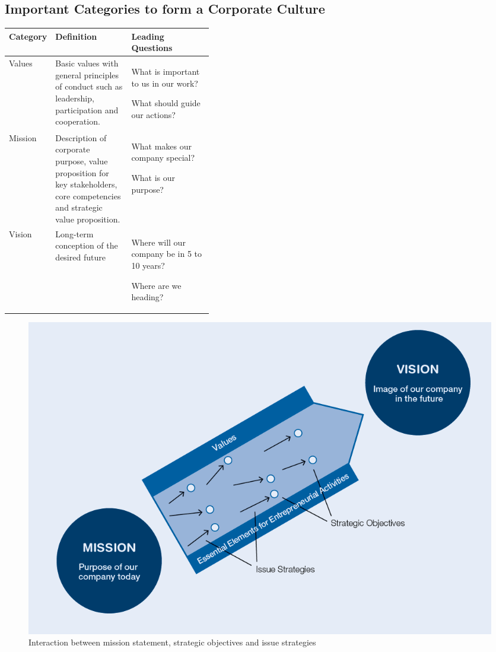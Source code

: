\documentclass[11pt]{article}
\theoremstyle{definition}
\begin{document}
\subsection{Important Categories to form a Corporate Culture}
\begin{tabularx}{\linewidth}{l X p{0.4\linewidth}}
	\textbf{Category} & \textbf{Definition} & \textbf{Leading Questions}\\
	\hline
	Values & Basic values with general principles of conduct such as leadership, participation and cooperation. & \begin{itemize}
		[
			left=0pt,
			nosep,
			before={\begin{minipage}[t]{\hsize}},
			after={\end{minipage}}
		]
		\item What is important to us in our work?
		\item What should guide our actions?
	\end{itemize}\\
	Mission & Description of corporate purpose, value proposition for key stakeholders, core competencies and strategic value proposition. & \begin{itemize}
		[
		left=0pt,
		nosep,
		before={\begin{minipage}[t]{\hsize}},
			after={\end{minipage}}
		]
		\item What makes our company special?
		\item What is our purpose?
	\end{itemize}\\
	Vision & Long-term conception of the desired future & \begin{itemize}
		[
		left=0pt,
		nosep,
		before={\begin{minipage}[t]{\hsize}},
			after={\end{minipage}}
		]
		\item Where will our company be in 5 to 10 years?
		\item Where are we heading?
	\end{itemize}
\end{tabularx}

\begin{figure}[H]
	\centering
	\includegraphics[width=0.7\linewidth]{img/interaction_mission_strategy_issues}
	\caption{Interaction between mission statement, strategic objectives and issue strategies}
	\label{fig:interactionmissionstrategyissues}
\end{figure}
\end{document}
